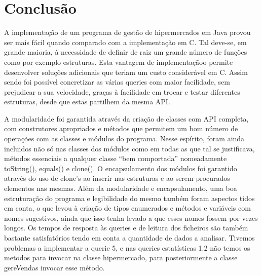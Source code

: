 \chapter{Conclusão}

A implementação de um programa de gestão de hipermercados em Java provou ser mais fácil
quando comparado com a implementação em C. Tal deve-se, em grande maioria, à necessidade de definir de raiz um grande número de funções como por exemplo estruturas. Esta vantagem de implementaçãoo permite desenvolver soluções adicionais que teriam um custo considerável em C.
Assim sendo foi possível concretizar as várias queries com maior facilidade, sem prejudicar a sua velocidade, graças à facilidade em trocar e testar diferentes estruturas, desde que estas partilhem da mesma API.

A modularidade foi garantida através da criação de classes com API completa, com construtores apropriados e métodos que permitem um bom número de operações com as classes e módulos do programa. Nesse espírito, foram ainda incluidos não só nas classes dos módulos como em todas as que tal se justificava, métodos essenciais a qualquer classe “bem comportada” nomeadamente toString(), equals() e clone().
O encapsulamento dos módulos foi garantido através do uso de clone’s ao inserir nas estruturas e ao serem procurados elementos nas mesmas.
Além da modularidade e encapsulamento, uma boa estruturação do programa e legibilidade do mesmo também foram aspectos tidos em conta, o que levou à criação de tipos enumerados e métodos e variáveis com nomes sugestivos, ainda que isso tenha levado a que esses nomes fossem por vezes longos.
Os tempos de resposta às queries e de leitura dos ficheiros são também bastante satisfatórios tendo em conta a quantidade de dados a analisar.
Tivemos problemas a implementar a querie 5, e nas queries  estatísticas 1.2 não temos os metodos para invocar na classe hipermercado, para posteriormente a classe gereVendas invocar esse método. 

